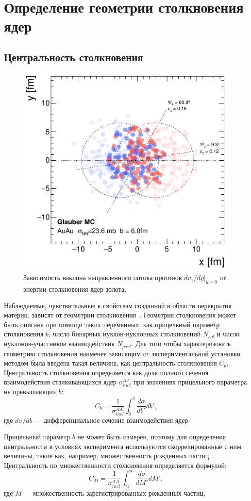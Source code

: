 \section{Определение геометрии столкновения ядер}

\subsection{Центральность столкновения}
\label{theory:centrality}
%
\begin{figure}
    \centering
    \includegraphics[width=0.5\linewidth]{images/glauber1.png}
    \caption{Зависимость наклона направленного потока протонов $dv_1/dy|_{y=0}$ от энергии столкновения ядер золота.}
    \label{fig:glauber1}
\end{figure}

Наблюдаемые, чувствительные к свойствам созданной в области перекрытия материи, зависят от геометрии столкновения~\cite{ALICE:2010mlf,ALICE:2015juo}.
Геометрия столкновения может быть описана при помощи таких переменных, как прицельный параметр столкновения $b$, число бинарных нуклон-нуклонных столкновений $N_{col}$ и число нуклонов-участников взаимодействия $N_{part}$.
Для того чтобы характеризовать геометрию столкновения наименее зависящим от экспериментальной установки методом была введена такая величина, как центральность столкновения $C_b$.
Центральность столкновения определяется как доля полного сечения взаимодействия сталкивающихся ядер $\sigma_{inel}^{AA}$ при значениях прицельного параметра не превышающих $b$:
\begin{equation}
    C_b = \frac{1}{\sigma_{inel}^{AA}} \int_{0}^{b} \frac{d\sigma}{db'}db',
\end{equation}
где $d\sigma/db$ --- дифференциальное сечение взаимодействия ядер.

Прицельный параметр $b$ не может быть измерен, поэтому для определения центральности в условиях эксперимента используются скоррелированные с ним величины, такие как, например, множественность рожденных частиц~\cite{Segal:2020ftt,HADES:2017def}.
Центральность по множественности столкновения определяется формулой:
\begin{equation}
    C_M = \frac{1}{\sigma_{inel}^{AA}} \int_{M}^{\infty} \frac{d\sigma}{dM'}dM',
\end{equation}
где $M$ --- множественность зарегистрированных рожденных частиц.

